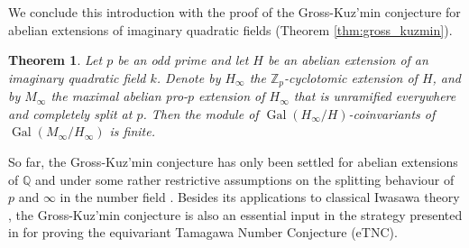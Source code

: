 \documentclass[12pt]{amsart}
\newcommand\bQ{\mathbb{Q}}
\newcommand\Zp{{\mathbb{Z}_p}}
\DeclareMathOperator{\Gal}{Gal}
\theoremstyle{defstyle}
\theoremstyle{thmstyle}
\newtheorem{THM}{Theorem}
\begin{document}
We conclude this introduction with the proof of the Gross-Kuz'min conjecture for abelian extensions of imaginary quadratic fields (Theorem \ref{thm:gross_kuzmin}).
\begin{THM}\label{thm:intro_D}
	Let $p$ be an odd prime and let $H$ be an abelian extension of an imaginary quadratic field $k$. Denote by $H_\infty$ the $\Zp$-cyclotomic extension of $H$, and by $M_\infty$ the maximal abelian pro-$p$ extension of $H_\infty$ that is unramified everywhere and completely split at $p$. Then the module of $\Gal(H_\infty/H)$-coinvariants of $\Gal(M_\infty/H_\infty)$ is finite. 
\end{THM}
So far, the Gross-Kuz'min conjecture has only been settled for abelian extensions of $\bQ$ \cite{greenberg1973} and under some rather restrictive assumptions on the splitting behaviour of $p$ and $\infty$ in the number field \cite{jaulent2003,kuzmin18,kleine}. Besides its applications to classical Iwasawa theory \cite{kuzmin,gross1981padic,federergross,kolster,nguyenquangdocapitulation,jaulent2017}, the Gross-Kuz'min conjecture is also an essential input in the strategy presented in \cite{BKSANT} for proving the equivariant Tamagawa Number Conjecture (eTNC). 
\end{document}
